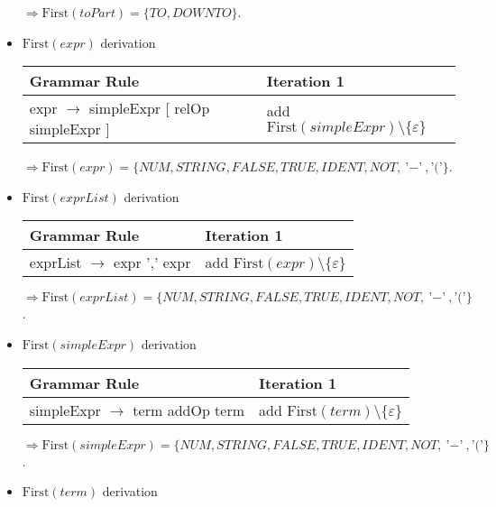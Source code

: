 \documentclass[8pt]{scrartcl}
\newcommand{\First}[1]{\mathrm{First}(#1)}
\newcommand{\epsset}{\{\varepsilon\}}
\begin{document}
\begin{itemize}
\begin{tabular}{|l |l |}
                    \hline
                \end{tabular}\newline
                $\Rightarrow \First{toPart} = \{TO,DOWNTO\}$.
            \item $\First{expr}$ derivation\newline
                \begin{tabular}{|l |l |}
                    \hline
                    \textbf{Grammar Rule} & \textbf{Iteration 1}\\
                    \hline
                    expr $\rightarrow$ simpleExpr [ relOp simpleExpr ] & add $\First{simpleExpr} \setminus \epsset$\\
                    \hline
                \end{tabular}\newline
                $\Rightarrow \First{expr} = \{NUM, STRING, FALSE, TRUE, IDENT, NOT, \text{'$-$'}, \text{'$($'}\}$.
            \item $\First{exprList}$ derivation\newline
                \begin{tabular}{|l |l |}
                    \hline
                    \textbf{Grammar Rule} & \textbf{Iteration 1}\\
                    \hline
                    exprList $\rightarrow$ expr { ',' expr } & add $\First{expr} \setminus \epsset$\\
                    \hline
                \end{tabular}\newline
                $\Rightarrow \First{exprList} = \{NUM, STRING, FALSE, TRUE, IDENT, NOT, \text{'$-$'}, \text{'$($'}\}$.
            \item $\First{simpleExpr}$ derivation\newline
                \begin{tabular}{|l |l |}
                    \hline
                    \textbf{Grammar Rule} & \textbf{Iteration 1}\\
                    \hline
                    simpleExpr $\rightarrow$ term { addOp term } & add $\First{term} \setminus \epsset$\\
                    \hline
                \end{tabular}\newline
                $\Rightarrow \First{simpleExpr} = \{NUM, STRING, FALSE, TRUE, IDENT, NOT, \text{'$-$'}, \text{'$($'}\}$.
            \item $\First{term}$ derivation\newline

\end{itemize}
\end{document}
